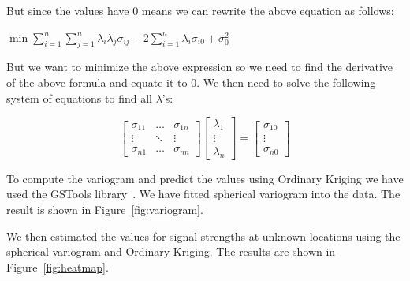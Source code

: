 But since the values have $0$ means we can rewrite the above equation as follows:

$\min \sum_{i=1}^{n}\sum_{j=1}^{n}\lambda_i\lambda_j\sigma_{ij}-2\sum_{i=1}^{n}\lambda_i\sigma_{i0} + \sigma^2_{0}$

But we want to minimize the above expression so we need to find the derivative of the above formula and 
equate it to $0$. We then need to solve the following system of equations to find all $\lambda$'s:

$$
\begin{bmatrix}
\sigma_{11} & \ldots & \sigma_{1n} \\
\vdots  & \ddots & \vdots \\
\sigma_{n1} & \ldots & \sigma_{nn}
\end{bmatrix}
\begin{bmatrix}
\lambda_1\\
\vdots \\
\lambda_n
\end{bmatrix}
=
\begin{bmatrix}
\sigma_{10}\\
\vdots \\
\sigma_{n0}
\end{bmatrix}
$$


To compute the variogram and predict the values using Ordinary Kriging we have used the GSTools library~\cite{gstools}.
We have fitted spherical  variogram into the data. The result is shown in Figure~\ref{fig:variogram}.



We then estimated the values for signal strengths at unknown locations using the spherical variogram and Ordinary Kriging. 
The results are shown in Figure~\ref{fig:heatmap}.




